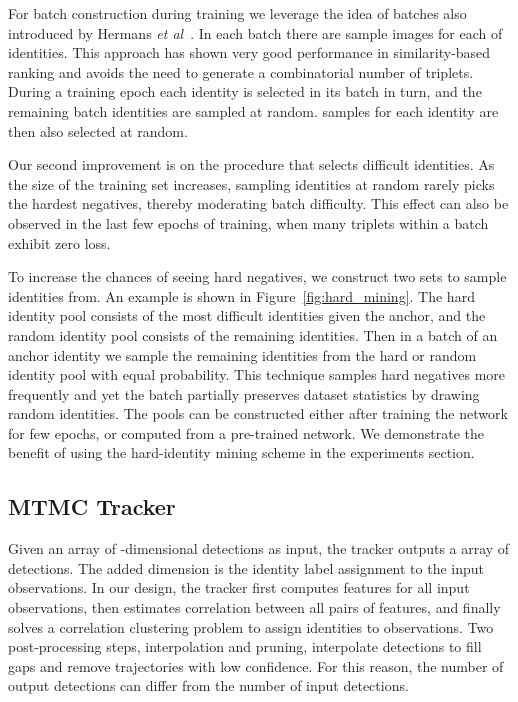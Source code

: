 \documentclass[10pt,twocolumn,letterpaper]{article}
\begin{document}
For batch construction during training we leverage the idea of  batches also introduced by Hermans \emph{et al}~\cite{hermans2017defense}. In each batch there are  sample images for each of  identities. This approach has shown very good performance in similarity-based ranking and avoids the need to generate a combinatorial number of triplets. During a training epoch each identity is selected in its batch in turn, and the remaining  batch identities are sampled at random.  samples for each identity are then also selected at random. 


Our second improvement is on the procedure that selects difficult identities. As the size of the training set increases, sampling  identities at random rarely picks the hardest negatives, thereby moderating batch difficulty. This effect can also be observed in the last few epochs of training, when many triplets within a batch exhibit zero loss. 

To increase the chances of seeing hard negatives, we construct two sets to sample identities from. An example is shown in Figure~\ref{fig:hard_mining}. The hard identity pool consists of the  most difficult identities given the anchor, and the random identity pool consists of the remaining identities. Then in a  batch of an anchor identity we sample the remaining  identities from the hard or random identity pool with equal probability. This technique samples hard negatives more frequently and yet the batch partially preserves dataset statistics by drawing random identities. The pools can be constructed either after training the network for few epochs, or computed from a pre-trained network. We demonstrate the benefit of using the hard-identity mining scheme in the experiments section. 









\subsection{MTMC Tracker}

Given an array  of -dimensional detections as input, the tracker outputs a  array  of  detections. The added dimension is the identity label assignment to the input observations. In our design, the tracker first computes features for all  input observations, then estimates correlation between all pairs of features, and finally solves a correlation clustering problem to assign identities to observations. Two post-processing steps, interpolation and pruning, interpolate detections to fill gaps and remove trajectories with low confidence. For this reason, the number  of output detections can differ from the number  of input detections.
\end{document}
